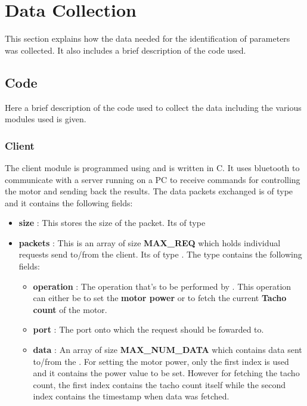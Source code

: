 \newpage
\section{Data Collection}
\label{sec:datacollection}


This section explains how the data needed for the identification of \LEGO parameters was collected. It also includes a brief description of the code used.

\subsection{Code}
\label{sec:code}

Here a brief description of the code used to collect the data including the various modules used is given.
\subsubsection{ \LEGO Client}
\label{sec:client}



The \LEGO client module is programmed using \NXT and is written in C. It uses bluetooth to communicate with a server running on a PC to receive commands for controlling the motor and sending back the results. The data packets exchanged is of type \BTPKT and it contains the following fields:
\newline
\begin{itemize}
	\item  \textbf{size} : This stores the size of the packet. Its of type \UITT
    \item \textbf{packets} : This is an array of size \textbf{MAX\_REQ} which holds individual requests send to/from the \LEGO client. Its of type \BTREQ . The \BTREQ type contains the following fields:
    \begin{itemize}
    \item \textbf{operation} : The operation that's to be performed by \LEGO . This operation can either be to set the \textbf{motor power} or to fetch the current \textbf{Tacho count} of the motor.
    \item \textbf{port} : The \LEGO port onto which the request should be fowarded to.
    \item \textbf{data} : An array of size \textbf{MAX\_NUM\_DATA} which contains data sent to/from the \LEGO . \newline For setting the motor power, only the first index is used and it contains the power value to be set. However for fetching the tacho count, the first index contains the tacho count itself while the second index contains the timestamp when data was fetched.
    \end{itemize}
    
\end{itemize}

